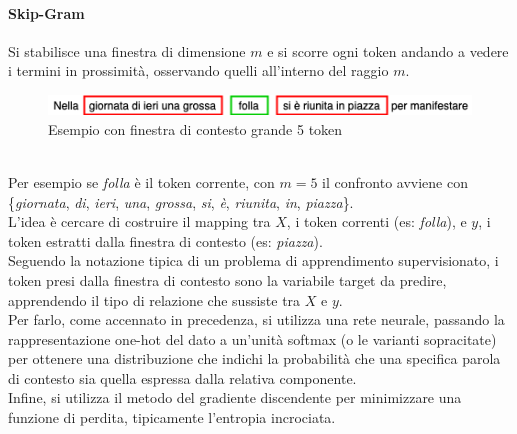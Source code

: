 \documentclass[12pt]{report}
\theoremstyle{definition}
\begin{document}
\paragraph{Skip-Gram}
Si stabilisce una finestra di dimensione $m$ e si scorre ogni token andando a vedere i termini in prossimità, osservando quelli all'interno del raggio $m$.
\\
\begin{figure}[!h]
    \centering
    \includegraphics[scale = 0.7]{images/skip-gram.png}
    \caption{Esempio con finestra di contesto grande 5 token}
    \label{skipgram}
\end{figure}
\\
Per esempio se \textit{folla} è il token corrente, con $m = 5$ il confronto avviene con \{\textit{giornata}, \textit{di}, \textit{ieri}, \textit{una}, \textit{grossa}, \textit{si}, \textit{è}, \textit{riunita}, \textit{in}, \textit{piazza}\}.
\\
L'idea è cercare di costruire il mapping tra $X$, i token correnti (es: \textit{folla}), e $y$, i token estratti dalla finestra di contesto (es: \textit{piazza}).
\\
Seguendo la notazione tipica di un problema di apprendimento supervisionato, i token presi dalla finestra di contesto sono la variabile target da predire, apprendendo il tipo di relazione che sussiste tra  $X$ e $y$.
\\
Per farlo, come accennato in precedenza, si utilizza una rete neurale, passando la rappresentazione one-hot del dato a un'unità softmax (o le varianti sopracitate) per ottenere una distribuzione che indichi la probabilità che una specifica parola di contesto sia quella espressa dalla relativa componente.
\\
Infine, si utilizza il metodo del gradiente discendente per minimizzare una funzione di perdita, tipicamente l'entropia incrociata. 
\end{document}
